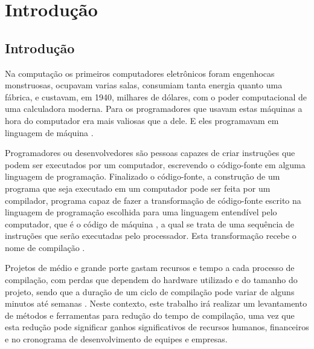 \part{Introdução}

\chapter*[Introdução]{Introdução}

Na computação os primeiros computadores eletrônicos foram engenhocas
 monstruosas, ocupavam varias salas, consumiam tanta energia quanto
 uma fábrica, e custavam, em 1940, milhares de dólares, com o poder
 computacional de uma calculadora moderna. Para os
 programadores que usavam estas máquinas a hora do computador era
 mais valiosas que a dele. E eles programavam em linguagem de
 máquina \cite{ref34}.

Programadores ou desenvolvedores são pessoas capazes de criar instruções
 que podem ser executados por um computador, escrevendo o código-fonte em
 alguma linguagem de programação. Finalizado o código-fonte, a construção
 de um programa que seja executado em um computador pode ser feita por um
 compilador, programa capaz de fazer a transformação de
 código-fonte escrito na linguagem de programação escolhida para uma linguagem
 entendível pelo computador, que é o código de máquina \cite{ref34}, a qual
 se trata de uma sequência de instruções que serão executadas  pelo
 processador. Esta transformação recebe o nome de compilação \cite{ref5}.

Projetos de médio e grande porte gastam recursos e tempo a cada processo
 de compilação, com perdas que dependem do hardware utilizado e do tamanho
 do projeto, sendo que a duração de um ciclo de compilação pode variar de
 alguns minutos até semanas \cite{ref52}. Neste contexto, este trabalho
 irá realizar um levantamento de métodos e ferramentas para redução do
 tempo de compilação, uma vez que esta redução pode significar ganhos
 significativos de recursos humanos, financeiros e no cronograma de
 desenvolvimento de equipes e empresas. 




